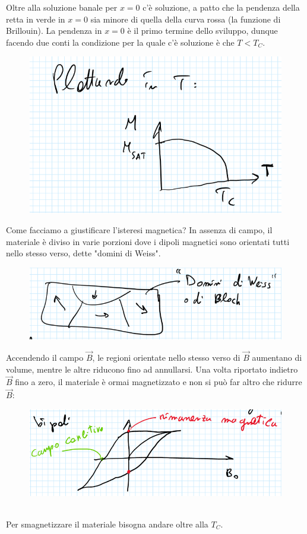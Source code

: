 \documentclass{book}
\begin{document}
        Oltre alla soluzione banale per $x=0$ c'è soluzione, a patto che la pendenza della retta in verde in $x=0$ sia minore di quella della curva rossa (la funzione di Brillouin). La pendenza in $x=0$ è il primo termine dello sviluppo, dunque facendo due conti la condizione per la quale c'è soluzione è che $T<T_{C}$.
        \begin{figure}[h!]
            \centering
            \includegraphics[width=0.75\linewidth]{img/pluto.png}
        \end{figure}
        Come facciamo a giustificare l'isteresi magnetica? In assenza di campo, il materiale è diviso in varie porzioni dove i dipoli magnetici sono orientati tutti nello stesso verso, dette "domini di Weiss".
        \begin{figure}[h!]
            \centering
            \includegraphics[width=0.5\linewidth]{img/DominiDiWeiss.png}
        \end{figure} \newpage
        Accendendo il campo $\vec{B}$, le regioni orientate nello stesso verso di $\vec{B}$ aumentano di volume, mentre le altre riducono fino ad annullarsi. Una volta riportato indietro $\vec{B}$ fino a zero, il materiale è ormai magnetizzato e non si può far altro che ridurre $\vec{B}$:
        \begin{figure}[h!]
            \centering
            \includegraphics[width=0.75\linewidth]{img/bing.png}
        \end{figure} \\
        Per smagnetizzare il materiale bisogna andare oltre alla $T_{C}$.
\end{document}
